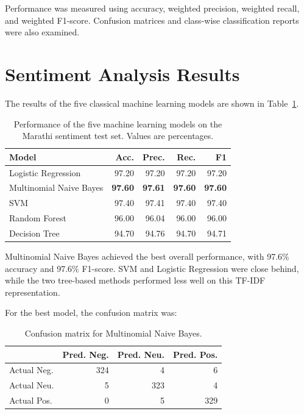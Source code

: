 \documentclass[11pt]{article}
\begin{document}
Performance was measured using accuracy, weighted precision, weighted recall, and weighted F1-score. Confusion matrices and class-wise classification reports were also examined.

\section{Sentiment Analysis Results}
The results of the five classical machine learning models are shown in Table~\ref{tab:sentiment-results}.

\begin{table}[t]
\centering
\small
\begin{tabular}{lrrrr}
\toprule
Model & Acc. & Prec. & Rec. & F1 \\
\midrule
Logistic Regression & 97.20 & 97.20 & 97.20 & 97.20 \\
Multinomial Naive Bayes & \textbf{97.60} & \textbf{97.61} & \textbf{97.60} & \textbf{97.60} \\
SVM & 97.40 & 97.41 & 97.40 & 97.40 \\
Random Forest & 96.00 & 96.04 & 96.00 & 96.00 \\
Decision Tree & 94.70 & 94.76 & 94.70 & 94.71 \\
\bottomrule
\end{tabular}
\caption{Performance of the five machine learning models on the Marathi sentiment test set. Values are percentages.}
\label{tab:sentiment-results}
\end{table}

Multinomial Naive Bayes achieved the best overall performance, with 97.6\% accuracy and 97.6\% F1-score. SVM and Logistic Regression were close behind, while the two tree-based methods performed less well on this TF-IDF representation.

For the best model, the confusion matrix was:

\begin{table}[t]
\centering
\small
\begin{tabular}{lrrr}
\toprule
 & Pred. Neg. & Pred. Neu. & Pred. Pos. \\
\midrule
Actual Neg. & 324 & 4 & 6 \\
Actual Neu. & 5 & 323 & 4 \\
Actual Pos. & 0 & 5 & 329 \\
\bottomrule
\end{tabular}
\caption{Confusion matrix for Multinomial Naive Bayes.}
\label{tab:confusion}
\end{table}
\end{document}
